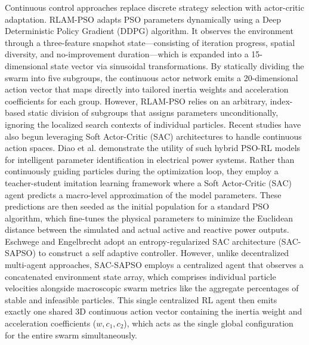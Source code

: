 \documentclass[final,5p,times]{elsarticle}
\begin{document}
Continuous control approaches replace discrete strategy selection with actor-critic adaptation.
RLAM-PSO \cite{Yin2023RLAMPSO} adapts PSO parameters dynamically using a Deep Deterministic Policy Gradient (DDPG) algorithm. 
It observes the environment through a three-feature snapshot state—consisting of iteration progress, spatial diversity, and no-improvement duration—which is expanded into a 15-dimensional state vector via sinusoidal transformations. 
By statically dividing the swarm into five subgroups, the continuous actor network emits a 20-dimensional action vector that maps directly into tailored inertia weights and acceleration coefficients for each group.
However, RLAM-PSO relies on an arbitrary, index-based static division of subgroups that assigns parameters unconditionally, ignoring the localized search contexts of individual particles.
Recent studies have also begun leveraging Soft Actor-Critic (SAC) architectures to handle continuous action spaces. Diao et al. \cite{Diao2024An} demonstrate the utility of such hybrid PSO-RL models for intelligent parameter identification in electrical power systems. 
Rather than continuously guiding particles during the optimization loop, they employ a teacher-student imitation learning framework where a Soft Actor-Critic (SAC) agent predicts a macro-level approximation of the model parameters. 
These predictions are then seeded as the initial population for a standard PSO algorithm, which fine-tunes the physical parameters to minimize the Euclidean distance between the simulated and actual active and reactive power outputs.
Eschwege and Engelbrecht \cite{vonEschwege2024Soft} adopt an entropy-regularized SAC architecture (SAC-SAPSO) to construct a self adaptive controller. 
However, unlike decentralized multi-agent approaches, SAC-SAPSO employs a centralized agent that observes a concatenated environment state array, which comprises individual particle velocities alongside macroscopic swarm metrics like the aggregate percentages of stable and infeasible particles. 
This single centralized RL agent then emits exactly one shared 3D continuous action vector containing the inertia weight and acceleration coefficients ($w, c_1, c_2$), which acts as the single global configuration for the entire swarm simultaneously.
\end{document}
